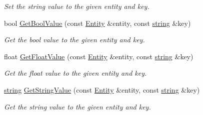 \begin{DoxyCompactItemize}
\begin{DoxyCompactList}\small\item\em Set the string value to the given entity and key. \end{DoxyCompactList}\item 
bool \hyperlink{class_ensum_1_1_components_1_1_data_manager_a1746cbced0b28fc0f4d09097f91e7959}{Get\+Bool\+Value} (const \hyperlink{struct_ensum_1_1_components_1_1_entity}{Entity} \&entity, const \hyperlink{class_ensum_1_1string}{string} \&key)\hypertarget{class_ensum_1_1_components_1_1_data_manager_a1746cbced0b28fc0f4d09097f91e7959}{}\label{class_ensum_1_1_components_1_1_data_manager_a1746cbced0b28fc0f4d09097f91e7959}

\begin{DoxyCompactList}\small\item\em Get the bool value to the given entity and key. \end{DoxyCompactList}\item 
float \hyperlink{class_ensum_1_1_components_1_1_data_manager_a47c2d9326214b16167d455f03a3473de}{Get\+Float\+Value} (const \hyperlink{struct_ensum_1_1_components_1_1_entity}{Entity} \&entity, const \hyperlink{class_ensum_1_1string}{string} \&key)\hypertarget{class_ensum_1_1_components_1_1_data_manager_a47c2d9326214b16167d455f03a3473de}{}\label{class_ensum_1_1_components_1_1_data_manager_a47c2d9326214b16167d455f03a3473de}

\begin{DoxyCompactList}\small\item\em Get the float value to the given entity and key. \end{DoxyCompactList}\item 
\hyperlink{class_ensum_1_1string}{string} \hyperlink{class_ensum_1_1_components_1_1_data_manager_ac7cd482c2e9aa4f1f88cc64301fa5b6b}{Get\+String\+Value} (const \hyperlink{struct_ensum_1_1_components_1_1_entity}{Entity} \&entity, const \hyperlink{class_ensum_1_1string}{string} \&key)\hypertarget{class_ensum_1_1_components_1_1_data_manager_ac7cd482c2e9aa4f1f88cc64301fa5b6b}{}\label{class_ensum_1_1_components_1_1_data_manager_ac7cd482c2e9aa4f1f88cc64301fa5b6b}

\begin{DoxyCompactList}\small\item\em Get the string value to the given entity and key. \end{DoxyCompactList}\end{DoxyCompactItemize}
